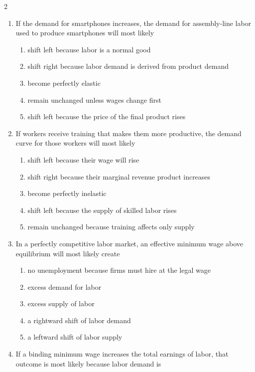 \documentclass[10pt]{article}
\newenvironment{choiceslist}
  {\begin{enumerate}[label=(\Alph*), leftmargin=1.6em, itemsep=0.12em, topsep=0.18em, parsep=0pt]}
  {\end{enumerate}}
\begin{document}
\begin{multicols*}{2}
\begin{enumerate}[resume*=apq, leftmargin=*, itemsep=0.85em, topsep=0.2em, parsep=0pt]
\begin{choiceslist}
\end{choiceslist}
\end{enumerate}
\begin{enumerate}[resume*=apq, leftmargin=*, itemsep=0.85em, topsep=0.2em, parsep=0pt]
\item If the demand for smartphones increases, the demand for assembly-line labor used to produce smartphones will most likely
\begin{choiceslist}
\item shift left because labor is a normal good
\item shift right because labor demand is derived from product demand
\item become perfectly elastic
\item remain unchanged unless wages change first
\item shift left because the price of the final product rises
\end{choiceslist}
\item If workers receive training that makes them more productive, the demand curve for those workers will most likely
\begin{choiceslist}
\item shift left because their wage will rise
\item shift right because their marginal revenue product increases
\item become perfectly inelastic
\item shift left because the supply of skilled labor rises
\item remain unchanged because training affects only supply
\end{choiceslist}
\item In a perfectly competitive labor market, an effective minimum wage above equilibrium will most likely create
\begin{choiceslist}
\item no unemployment because firms must hire at the legal wage
\item excess demand for labor
\item excess supply of labor
\item a rightward shift of labor demand
\item a leftward shift of labor supply
\end{choiceslist}
\item If a binding minimum wage increases the total earnings of labor, that outcome is most likely because labor demand is
\begin{choiceslist}

\end{choiceslist}
\end{enumerate}
\end{multicols*}
\end{document}
